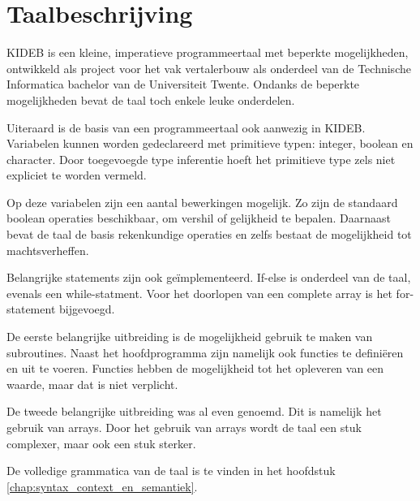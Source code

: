 \chapter{Taalbeschrijving}
    \label{chap:taalbeschrijving}
KIDEB is een kleine, imperatieve programmeertaal met beperkte mogelijkheden, ontwikkeld als project voor het vak vertalerbouw als onderdeel van de Technische Informatica bachelor van de Universiteit Twente. Ondanks de beperkte mogelijkheden bevat de taal toch enkele leuke onderdelen.

Uiteraard is de basis van een programmeertaal ook aanwezig in KIDEB. Variabelen kunnen worden gedeclareerd met primitieve typen: integer, boolean en character. Door toegevoegde type inferentie hoeft het primitieve type zels niet expliciet te worden vermeld. 

Op deze variabelen zijn een aantal bewerkingen mogelijk. Zo zijn de standaard boolean operaties beschikbaar, om vershil of gelijkheid te bepalen. Daarnaast bevat de taal de basis rekenkundige operaties en zelfs bestaat de mogelijkheid tot machtsverheffen.

Belangrijke statements zijn ook ge\"implementeerd. If-else is onderdeel van de taal, evenals een while-statment. Voor het doorlopen van een complete array is het for-statement bijgevoegd.

De eerste belangrijke uitbreiding is de mogelijkheid gebruik te maken van subroutines. Naast het hoofdprogramma zijn namelijk ook functies te defini\"eren en uit te voeren. Functies hebben de mogelijkheid tot het opleveren van een waarde, maar dat is niet verplicht.

De tweede belangrijke uitbreiding was al even genoemd. Dit is namelijk het gebruik van arrays. Door het gebruik van arrays wordt de taal een stuk complexer, maar ook een stuk sterker.

De volledige grammatica van de taal is te vinden in het hoofdstuk \ref{chap:syntax_context_en_semantiek}.

\clearpage